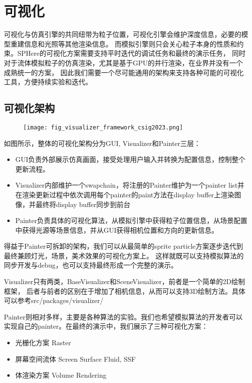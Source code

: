 \section{可视化}

可视化与仿真引擎的共同纽带为粒子位置，可视化引擎会维护深度信息，必要的模型重建信息和光照等其他渲染信息。
而模拟引擎则只会关心粒子本身的性质和约束。SPHere的可视化方案需要支持平时迭代的调试任务和最终的演示任务，
同时对于流体模拟粒子的仿真渲染，尤其是基于GPU的并行渲染，在业界并没有一个成熟统一的方案，
因此我们需要一个尽可能通用的架构来支持各种可能的可视化工具，方便持续实验和迭代。

\subsection{可视化架构}

\begin{figure}[H]
	\centering
	\texttt{[image: fig\_visualizer\_framework\_csig2023.png]}
\end{figure}

如图所示，整体的可视化架构分为GUI, Visualizer和Painter三层：

\begin{itemize}
	\item GUI负责外部展示仿真画面，接受处理用户输入并转换为配置信息，控制整个更新流程。
	\item Visualizer内部维护一个swapchain，将注册的Painter维护为一个painter list并在渲染更新过程中依次调用每个painter的paint方法在display buffer上渲染图像，并最终将display buffer同步到前台
	\item Painter负责具体的可视化算法，从模拟引擎中获得粒子位置信息，从场景配置中获得光源等场景信息，并从GUI获得相机位置和方向的更新信息。
\end{itemize}

得益于Painter可拆卸的架构，我们可以从最简单的sprite particle方案逐步迭代到最终兼顾灯光，场景，美术效果的可视化方案上。
这样就既可以支持模拟算法的同步开发与debug，也可以支持最终形成一个完整的演示。

Visualizer只有两类，BaseVisualizer和SceneVisualizer，前者是一个简单的2D绘制框架，
后者与前者的区别在于增加了相机信息，从而可以支持3D绘制方法。具体可以参考src/packages/visualizer/

Painter则相对多样，主要是各种算法的实验。我们也希望模拟算法的开发者可以实现自己的painter。在最终的演示中，我们展示了三种可视化方案：

\begin{itemize}
	\item 光栅化方案 Raster
	\item 屏幕空间流体 Screen Surface Fluid, SSF
	\item 体渲染方案 Volume Rendering
\end{itemize}

